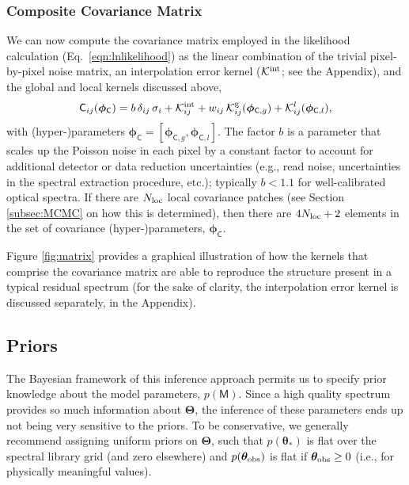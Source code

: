 \documentclass[iop,floatfix,twocolappendix]{emulateapj}
\newcommand{\vM}{\mathsf{M}}
\newcommand{\vC}{\mathsf{C}}
\newcommand{\vt}{ {\bm \theta}}
\newcommand{\vT}{ {\bm \Theta}}
\newcommand{\vp}{ {\bm \phi}}
\newcommand{\cov}{ \vp_{\mathsf{C}}}
\newcommand{\KK}{\mathcal{K}}
\newcommand{\Kglobal}{\KK^{\textrm{g}}}
\newcommand{\Klocal}{\KK^l}
\begin{document}
\subsubsection{Composite Covariance Matrix}

We can now compute the covariance matrix employed in the likelihood calculation 
(Eq.~\ref{eqn:lnlikelihood}) as the linear combination of the trivial pixel-by-pixel noise matrix, 
an interpolation error kernel ($\mathcal{K}^{\rm int}$; see the Appendix), and the global and local 
kernels discussed above, 
\begin{equation}
\vC_{ij}(\cov)  = b \, \delta_{ij} \, \sigma_i + \mathcal{K}_{ij}^{\rm int} + w_{ij} \, \Kglobal_{ij}(\vp_{{\mathsf C}, g}) + 
                  \Klocal_{ij}(\vp_{{\mathsf C}, l}), 
\end{equation}
with (hyper-)parameters $\cov = [\vp_{{\mathsf C}, g}, \vp_{{\mathsf C}, l}]$.  The factor $b$ is 
a parameter that scales up the Poisson noise in each pixel by a constant factor to account for 
additional detector or data reduction uncertainties (e.g., read noise, uncertainties in the 
spectral extraction procedure, etc.); typically $b < 1.1$ for well-calibrated optical spectra.  If 
there are $N_{\rm loc}$ local covariance patches (see Section \ref{subsec:MCMC} on how this is 
determined), then there are $4N_{\rm loc}+2$ elements in the set of covariance (hyper-)parameters, 
$\cov$.  

Figure \ref{fig:matrix} provides a graphical illustration of how the kernels that comprise the 
covariance matrix are able to reproduce the structure present in a typical residual spectrum (for 
the sake of clarity, the interpolation error kernel is discussed separately, in the Appendix).  


\subsection{Priors} \label{subsec:priors}

The Bayesian framework of this inference approach permits us to specify prior knowledge about the 
model parameters, $p(\vM)$.  Since a high quality spectrum provides so much information about 
$\vT$, the inference of these parameters ends up not being very sensitive to the priors.  To be 
conservative, we generally recommend assigning uniform priors on $\vT$, such that $p(\vt_{\ast})$
is flat over the spectral library grid (and zero elsewhere) and $p(\vt_{\rm obs})$ is flat if 
$\vt_{\rm obs} \ge 0$ (i.e., for physically meaningful values).  
\end{document}
